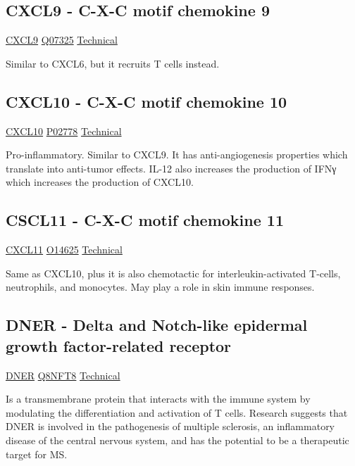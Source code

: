\subsection{CXCL9 - C-X-C motif chemokine 9}

\href{https://en.wikipedia.org/wiki/CXCL9}{CXCL9}
\href{http://www.uniprot.org/uniprot/Q07325}{Q07325}
\href{https://olink.com/products-services/target/protein/?assayID=5081}{Technical}

Similar to CXCL6, but it recruits T cells instead.

\subsection{CXCL10 - C-X-C motif chemokine 10}

\href{https://en.wikipedia.org/wiki/CXCL10}{CXCL10}
\href{http://www.uniprot.org/uniprot/P02778}{P02778}
\href{https://olink.com/products-services/target/protein/?assayID=5093}{Technical}

Pro-inflammatory. Similar to CXCL9. It has anti-angiogenesis properties which translate into anti-tumor effects. IL-12 also increases the production of IFNγ which increases the production of CXCL10.

\subsection{CSCL11 - C-X-C motif chemokine 11}

\href{https://en.wikipedia.org/wiki/CXCL11}{CXCL11}
\href{http://www.uniprot.org/uniprot/O14625}{O14625}
\href{https://olink.com/products-services/target/protein/?assayID=5077}{Technical}

Same as CXCL10, plus it is also chemotactic for interleukin-activated T-cells, neutrophils, and monocytes. May play a role in skin immune responses.

\subsection{DNER - Delta and Notch-like epidermal growth factor-related receptor}

\href{https://en.wikipedia.org/wiki/DNER}{DNER}
\href{http://www.uniprot.org/uniprot/Q8NFT8}{Q8NFT8}
\href{https://olink.com/products-services/target/protein/?assayID=5088}{Technical}

Is a transmembrane protein that interacts with the immune system by modulating the differentiation and activation of T cells. Research suggests that DNER is involved in the pathogenesis of multiple sclerosis, an inflammatory disease of the central nervous system, and has the potential to be a therapeutic target for MS.

